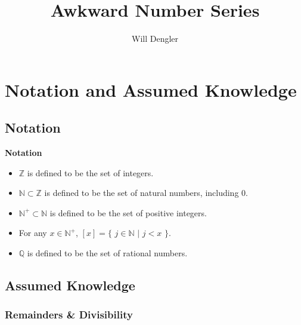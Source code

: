 \documentclass[a4paper,12pt]{article}
\begin{document}
\title{Awkward Number Series}
\author{Will Dengler}
\maketitle

\section{Notation and Assumed Knowledge}
\label{section:notation_and_assumed_knowledge}


\subsection{Notation}
\label{subsection:notation}

\label{notation}
\hypertarget{notation}{}
\begin{tcolorbox}
\textbf{Notation}

\begin{itemize}

\item $\mathbb{Z}$ is defined to be the set of integers.

\item $\mathbb{N} \subset \mathbb{Z}$ is defined to be the set of natural numbers, including $0$.

\item $\mathbb{N}^+ \subset \mathbb{N}$ is defined to be the set of positive integers.

\item For any $x \in \mathbb{N}^+$, $[x] = \{$ $j \in \mathbb{N}$ $|$ $j < x$ $\}$.

\item $\mathbb{Q}$ is defined to be the set of rational numbers.
\end{itemize}
\end{tcolorbox}





\subsection{Assumed Knowledge}
\label{subsection:assumed_knowledge}


\subsubsection{Remainders \& Divisibility}
\label{subsubsection:remainders_and_divisibility}
\end{document}
